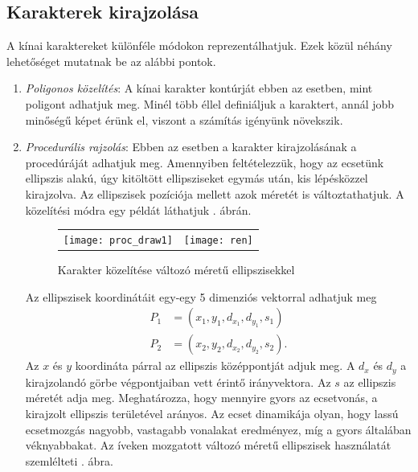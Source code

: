 \subsection{Karakterek kirajzolása}

A kínai karaktereket különféle módokon reprezentálhatjuk. Ezek közül néhány lehetőséget mutatnak be az alábbi pontok.

\begin{enumerate}
\item \textit{Poligonos közelítés}: A kínai karakter kontúrját ebben az esetben, mint poligont adhatjuk meg. Minél több éllel definiáljuk a karaktert, annál jobb minőségű képet érünk el, viszont a számítás igényünk növekszik.
\item \textit{Procedurális rajzolás}: Ebben az esetben a karakter kirajzolásának a procedúráját adhatjuk meg. Amennyiben feltételezzük, hogy az ecsetünk ellipszis alakú, úgy kitöltött ellipsziseket egymás után, kis lépésközzel kirajzolva. Az ellipszisek pozíciója mellett azok méretét is változtathatjuk. A közelítési módra egy példát láthatjuk . ábrán.

\begin{figure}
\centering
\begin{tabular}{ c c }
\texttt{[image: proc\_draw1]} & \texttt{[image: ren]}
\end{tabular}
\caption{Karakter közelítése változó méretű ellipszisekkel}
\label{fig:proc_draw}
\end{figure}

Az ellipszisek koordinátáit egy-egy 5 dimenziós vektorral adhatjuk meg
\begin{align*}
P_1 &= (x_1, y_1, d_{x_1}, d_{y_1}, s_1) \\
P_2 &= (x_2, y_2, d_{x_2}, d_{y_2}, s_2).
\end{align*}
Az $x$ és $y$ koordináta párral az ellipszis középpontját adjuk meg. A $d_x$ és $d_y$ a kirajzolandó görbe végpontjaiban vett érintő irányvektora. Az $s$ az ellipszis méretét adja meg. Meghatározza, hogy mennyire gyors az ecsetvonás, a kirajzolt ellipszis területével arányos. Az ecset dinamikája olyan, hogy lassú ecsetmozgás nagyobb, vastagabb vonalakat eredményez, míg a gyors általában véknyabbakat. Az íveken mozgatott változó méretű ellipszisek használatát szemlélteti . ábra.


\end{enumerate}

